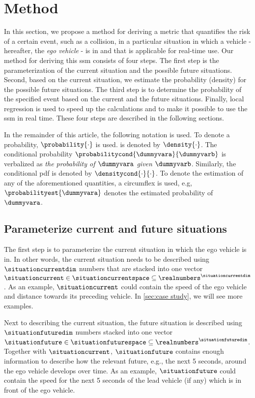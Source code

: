 \section{Method}
\label{sec:method}

In this section, we propose a method for deriving a metric that quantifies the risk of a certain event, such as a collision, in a particular situation in which a vehicle - hereafter, the \textit{ego vehicle} - is in and that is applicable for real-time use.
Our method for deriving this \ac{ssm} consists of four steps. 
The first step is the parameterization of the current situation and the possible future situations.
Second, based on the current situation, we estimate the probability (density) for the possible future situations. 
The third step is to determine the probability of the specified event based on the current and the future situations.
Finally, local regression is used to speed up the calculations and to make it possible to use the \ac{ssm} in real time. 
These four steps are described in the following sections.

In the remainder of this article, the following notation is used. 
To denote a probability, $\probability{\cdot}$ is used. 
 is denoted by $\density{\cdot}$. 
The conditional probability $\probabilitycond{\dummyvara}{\dummyvarb}$ is verbalized as \textit{the probability of $\dummyvara$ given $\dummyvarb$}. 
Similarly, the conditional \ac{pdf} is denoted by $\densitycond{\cdot}{\cdot}$. 
To denote the estimation of any of the aforementioned quantities, a circumflex is used, e.g, $\probabilityest{\dummyvara}$ denotes the estimated probability of $\dummyvara$.



\subsection{Parameterize current and future situations}
\label{sec:parametrization}

The first step is to parameterize the current situation in which the ego vehicle is in. 
In other words, the current situation needs to be described using $\situationcurrentdim$ numbers that are stacked into one vector $\situationcurrent \in \situationcurrentspace \subseteq \realnumbers^{\situationcurrentdim}$. 
As an example, $\situationcurrent$ could contain the speed of the ego vehicle and distance towards its preceding vehicle. 
In \cref{sec:case study}, we will see more examples.

Next to describing the current situation, the future situation is described using $\situationfuturedim$ numbers stacked into one vector $\situationfuture \in \situationfuturespace \subseteq \realnumbers^{\situationfuturedim}$. 
Together with $\situationcurrent$, $\situationfuture$ contains enough information to describe how the relevant future, e.g., the next 5 seconds, around the ego vehicle develops over time. 
As an example, $\situationfuture$ could contain the speed for the next 5 seconds of the lead vehicle (if any) which is in front of the ego vehicle.


